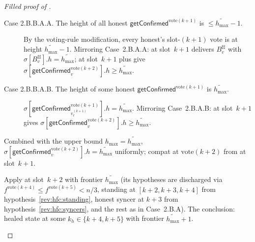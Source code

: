 \documentclass{article}
\newcommand{\hmax}{\ensuremath{h_{\max}}\xspace}
\newcommand{\vote}{\ensuremath{\mathrm{vote}}}
\newcommand{\comm}[1]{\ensuremath{\widetilde{#1}}}
\newcommand{\getConfirmed}{\textsf{getConfirmed}\xspace}
\theoremstyle{plain}
\theoremstyle{definition}
\theoremstyle{remark}
\begin{document}
\begin{proof}[Filled proof of ]
\begin{description}[style=nextline]
\begin{description}[style=nextline]
\begin{description}[style=nextline]
\begin{description}
            \begin{description}
              \item[Case 2.B.B.A.A. The height of all honest $\getConfirmed^{\vote(k+1)}$ is $\leq \comm{\hmax}-1$.]
                By the voting-rule modification, every honest's slot-$(k+1)$ vote is at height $\comm{\hmax}-1$.
                Mirroring Case~2.B.A.A:  at slot~$k+1$ delivers $B^{\sharp\sharp}_v$ with $\sigma[B^{\sharp\sharp}_v].h = \comm{\hmax}$;
                 at slot~$k+1$ plus  give $\sigma[\getConfirmed_v^{\vote(k+2)}].h \geq \comm{\hmax}$.

              \item[Case 2.B.B.A.B. The height of some honest $\getConfirmed^{\vote(k+1)}$ is $\comm{\hmax}$.]
                $\sigma[\getConfirmed_{v_\ell^{(k+1)}}^{\vote(k+1)}].h = \comm{\hmax}$.
                Mirroring Case~2.B.A.B:  at slot~$k+1$ gives $\sigma[\getConfirmed_v^{\vote(k+2)}].h \geq \comm{\hmax}$.
            \end{description}

            Combined with the upper bound $\hmax = \comm{\hmax}$, $\sigma[\getConfirmed_v^{\vote(k+2)}].h = \comm{\hmax}$ uniformly;
            compat at $\vote(k+2)$ from  at slot~$k+1$.

            Apply  at slot~$k+2$ with frontier $\comm{\hmax}$ (its hypotheses are discharged via $f^{\vote(k+4)} \leq f^{\vote(k+5)} < n/3$, standing at $[k+2, k+3, k+4]$ from hypothesis~\ref{rev:hfc:standing}, honest syncer at $k+3$ from hypothesis~\ref{rev:hfc:syncers}, and the rest as in Case~2.B.A).
            The conclusion: healed state at some $k_h \in \{k+4, k+5\}$ with frontier $\comm{\hmax}+1$.


\end{description}
\end{description}
\end{description}
\end{description}
\end{proof}
\end{document}

